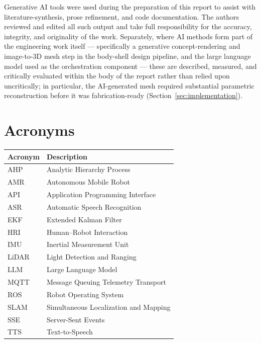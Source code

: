 \documentclass[11pt,a4paper]{article}
\begin{document}
\noindent Generative AI tools were used during the preparation of this report to assist with literature-synthesis, prose refinement, and code documentation. The authors reviewed and edited all such output and take full responsibility for the accuracy, integrity, and originality of the work. Separately, where AI methods form part of the engineering work itself --- specifically a generative concept-rendering and image-to-3D mesh step in the body-shell design pipeline, and the large language model used as the orchestration component --- these are described, measured, and critically evaluated within the body of the report rather than relied upon uncritically; in particular, the AI-generated mesh required substantial parametric reconstruction before it was fabrication-ready (Section~\ref{sec:implementation}).

\newpage
\thispagestyle{empty}
\section*{Acronyms}

\begin{tabular}{@{}ll@{}}
\toprule
\textbf{Acronym} & \textbf{Description} \\
\midrule
AHP & Analytic Hierarchy Process \\
AMR & Autonomous Mobile Robot \\
API & Application Programming Interface \\
ASR & Automatic Speech Recognition \\
EKF & Extended Kalman Filter \\
HRI & Human--Robot Interaction \\
IMU & Inertial Measurement Unit \\
LiDAR & Light Detection and Ranging \\
LLM & Large Language Model \\
MQTT & Message Queuing Telemetry Transport \\
ROS & Robot Operating System \\
SLAM & Simultaneous Localization and Mapping \\
SSE & Server-Sent Events \\
TTS & Text-to-Speech \\
\bottomrule
\end{tabular}
\end{document}
